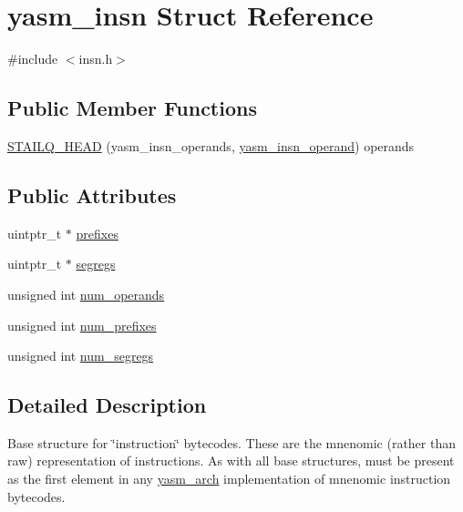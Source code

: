 \hypertarget{structyasm__insn}{\section{yasm\-\_\-insn Struct Reference}
\label{structyasm__insn}
}


{\ttfamily \#include $<$insn.\-h$>$}

\subsection*{Public Member Functions}
\begin{DoxyCompactItemize}
\item 
\hyperlink{structyasm__insn_ac5ad8faa40b4f2d29277d0cd09301acf}{S\-T\-A\-I\-L\-Q\-\_\-\-H\-E\-A\-D} (yasm\-\_\-insn\-\_\-operands, \hyperlink{structyasm__insn__operand}{yasm\-\_\-insn\-\_\-operand}) operands
\end{DoxyCompactItemize}
\subsection*{Public Attributes}
\begin{DoxyCompactItemize}
\item 
uintptr\-\_\-t $\ast$ \hyperlink{structyasm__insn_a948dae24d2851a148b09df5dab8738ae}{prefixes}
\item 
uintptr\-\_\-t $\ast$ \hyperlink{structyasm__insn_ab06d761894e4d0684c85388e574f9ce6}{segregs}
\item 
unsigned int \hyperlink{structyasm__insn_a9ac9742d8c980c7e09ed6e2a7be54d68}{num\-\_\-operands}
\item 
unsigned int \hyperlink{structyasm__insn_a197439fed907e61b04a9f154cfa64379}{num\-\_\-prefixes}
\item 
unsigned int \hyperlink{structyasm__insn_a453de6522b676b79e5259a3d931eb786}{num\-\_\-segregs}
\end{DoxyCompactItemize}


\subsection{Detailed Description}
Base structure for \char`\"{}instruction\char`\"{} bytecodes. These are the mnenomic (rather than raw) representation of instructions. As with all base structures, must be present as the first element in any \hyperlink{coretype_8h_a8e0de61d73c940f0e7b6ef12e0dc1c70}{yasm\-\_\-arch} implementation of mnenomic instruction bytecodes. 

